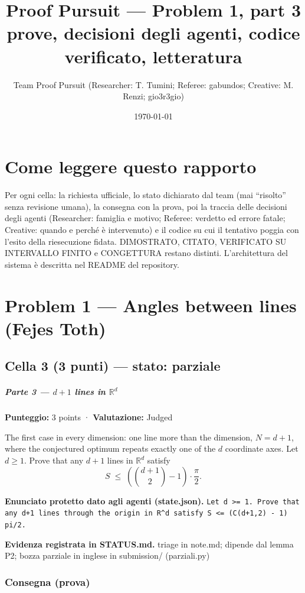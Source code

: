 \documentclass[11pt,a4paper]{article}
\title{Proof Pursuit --- Problem 1, part 3\\ \large prove, decisioni degli agenti, codice verificato, letteratura}
\author{Team Proof Pursuit (Researcher: T. Tumini; Referee: gabundos; Creative: M. Renzi; gio3r3gio)}
\date{\today}
\begin{document}
\maketitle\tableofcontents
\section*{Come leggere questo rapporto}
Per ogni cella: la richiesta ufficiale, lo stato dichiarato dal team (mai ``risolto'' senza revisione umana), la consegna
con la prova, poi la traccia delle decisioni degli agenti (Researcher: famiglia e motivo; Referee: verdetto ed errore
fatale; Creative: quando e perché è intervenuto) e il codice su cui il tentativo poggia con l'esito della riesecuzione
fidata. DIMOSTRATO, CITATO, VERIFICATO SU INTERVALLO FINITO e CONGETTURA restano distinti. L'architettura del sistema
è descritta nel README del repository.
\section{Problem 1 — Angles between lines (Fejes Toth)}
\subsection{Cella 3 (3 punti) — stato: parziale}
\subparagraph{\texorpdfstring{Parte 3 --- \(d+1\) lines in
\(\mathbb{R}^d\)}{Parte 3 --- d+1 lines in \textbackslash mathbb\{R\}\^{}d}}\label{parte-3-d1-lines-in-mathbbrd}

\textbf{Punteggio:} 3 points · \textbf{Valutazione:} Judged

The first case in every dimension: one line more than the dimension,
\(N = d+1\), where the conjectured optimum repeats exactly one of the
\(d\) coordinate axes. Let \(d \ge 1\). Prove that any \(d+1\) lines in
\(\mathbb{R}^d\) satisfy \[
S \;\le\; \left( \binom{d+1}{2} - 1 \right) \cdot \frac{\pi}{2}.
\]

\textbf{Enunciato protetto dato agli agenti (state.json).} \texttt{Let d \textgreater{}= 1. Prove that any d+1 lines through the origin in R\textasciicircum{}d satisfy S \textless{}= (C(d+1,2) - 1) pi/2.}

\textbf{Evidenza registrata in STATUS.md.} triage in note.md; dipende dal lemma P2; bozza parziale in inglese in submission/ (parziali.py)

\subsubsection{Consegna (prova)}
\end{document}
